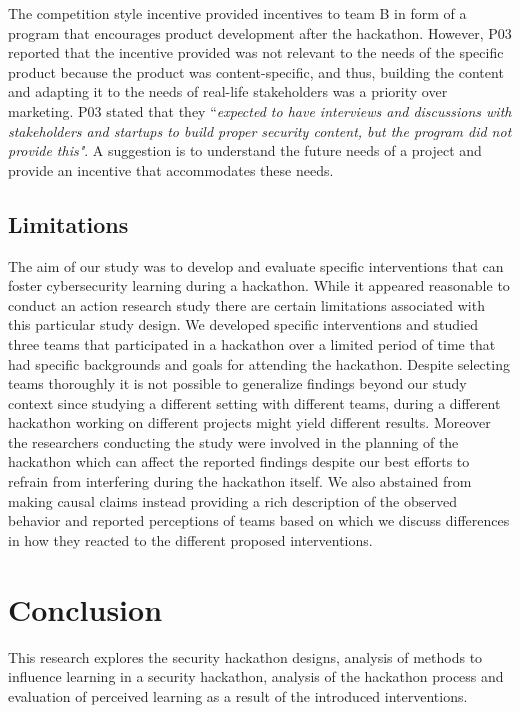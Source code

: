 \documentclass[runningheads]{llncs}
\begin{document}
The competition style incentive provided incentives to team B in form of a program that encourages product development after the hackathon. 
However, P03 reported that the incentive provided was not relevant to the needs of the specific product because the product was content-specific, and thus, building the content and adapting it to the needs of real-life stakeholders was a priority over marketing. P03 stated that they ``\textit{expected to have interviews and discussions with stakeholders and startups to build proper security content, but the program did not provide this"}. A suggestion is to understand the future needs of a project and provide an incentive that accommodates these needs.

\subsection{Limitations}
The aim of our study was to develop and evaluate specific interventions that can foster cybersecurity learning during a hackathon. While it appeared reasonable to conduct an action research study \cite{lewin1946action} there are certain limitations associated with this particular study design. We developed specific interventions and studied three teams that participated in a hackathon over a limited period of time that had specific backgrounds and goals for attending the hackathon. Despite selecting teams thoroughly it is not possible to generalize findings beyond our study context since studying a different setting with different teams, during a different hackathon working on different projects might yield different results. Moreover the researchers conducting the study were involved in the planning of the hackathon which can affect the reported findings despite our best efforts to refrain from interfering during the hackathon itself. We also abstained from making causal claims instead providing a rich description of the observed behavior and reported perceptions of teams based on which we discuss differences in how they reacted to the different proposed interventions.

\section{Conclusion}
This research explores the security hackathon designs, analysis of methods to influence learning in a security hackathon, analysis of the hackathon process and evaluation of perceived learning as a result of the introduced interventions.



\end{document}
